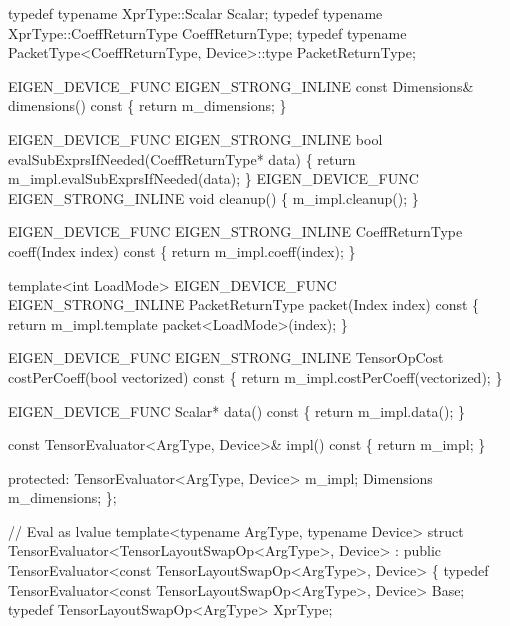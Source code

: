 \begin{DoxyCodeInclude}
  \textcolor{keyword}{typedef} \textcolor{keyword}{typename} XprType::Scalar Scalar;
  \textcolor{keyword}{typedef} \textcolor{keyword}{typename} XprType::CoeffReturnType CoeffReturnType;
  \textcolor{keyword}{typedef} \textcolor{keyword}{typename} PacketType<CoeffReturnType, Device>::type PacketReturnType;

  EIGEN\_DEVICE\_FUNC EIGEN\_STRONG\_INLINE \textcolor{keyword}{const} Dimensions& dimensions()\textcolor{keyword}{ const }\{ \textcolor{keywordflow}{return} m\_dimensions; \}

  EIGEN\_DEVICE\_FUNC EIGEN\_STRONG\_INLINE \textcolor{keywordtype}{bool} evalSubExprsIfNeeded(CoeffReturnType* data) \{
    \textcolor{keywordflow}{return} m\_impl.evalSubExprsIfNeeded(data);
  \}
  EIGEN\_DEVICE\_FUNC EIGEN\_STRONG\_INLINE \textcolor{keywordtype}{void} cleanup() \{
    m\_impl.cleanup();
  \}

  EIGEN\_DEVICE\_FUNC EIGEN\_STRONG\_INLINE CoeffReturnType coeff(Index index)\textcolor{keyword}{ const}
\textcolor{keyword}{  }\{
    \textcolor{keywordflow}{return} m\_impl.coeff(index);
  \}

  \textcolor{keyword}{template}<\textcolor{keywordtype}{int} LoadMode>
  EIGEN\_DEVICE\_FUNC EIGEN\_STRONG\_INLINE PacketReturnType packet(Index index)\textcolor{keyword}{ const}
\textcolor{keyword}{  }\{
    \textcolor{keywordflow}{return} m\_impl.template packet<LoadMode>(index);
  \}

  EIGEN\_DEVICE\_FUNC EIGEN\_STRONG\_INLINE TensorOpCost costPerCoeff(\textcolor{keywordtype}{bool} vectorized)\textcolor{keyword}{ const }\{
    \textcolor{keywordflow}{return} m\_impl.costPerCoeff(vectorized);
  \}

  EIGEN\_DEVICE\_FUNC Scalar* data()\textcolor{keyword}{ const }\{ \textcolor{keywordflow}{return} m\_impl.data(); \}

  \textcolor{keyword}{const} TensorEvaluator<ArgType, Device>& impl()\textcolor{keyword}{ const }\{ \textcolor{keywordflow}{return} m\_impl; \}

 \textcolor{keyword}{protected}:
  TensorEvaluator<ArgType, Device> m\_impl;
  Dimensions m\_dimensions;
\};


\textcolor{comment}{// Eval as lvalue}
\textcolor{keyword}{template}<\textcolor{keyword}{typename} ArgType, \textcolor{keyword}{typename} Device>
  \textcolor{keyword}{struct }TensorEvaluator<TensorLayoutSwapOp<ArgType>, Device>
  : \textcolor{keyword}{public} TensorEvaluator<const TensorLayoutSwapOp<ArgType>, Device>
\{
  \textcolor{keyword}{typedef} TensorEvaluator<const TensorLayoutSwapOp<ArgType>, Device> Base;
  \textcolor{keyword}{typedef} TensorLayoutSwapOp<ArgType> XprType;


\end{DoxyCodeInclude}
